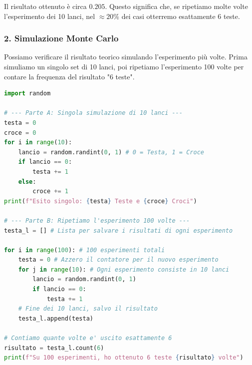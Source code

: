 \documentclass[openany,a4paper,12pt]{book}
\theoremstyle{remark}
\begin{document}
Il risultato ottenuto è circa $0.205$. Questo significa che, se ripetiamo molte volte l'esperimento dei 10 lanci, nel $\approx 20\%$ dei casi otterremo esattamente 6 teste.

\subsubsection*{2. Simulazione Monte Carlo}
Possiamo verificare il risultato teorico simulando l'esperimento più volte.
Prima simuliamo un singolo set di 10 lanci, poi ripetiamo l'esperimento 100 volte per contare la frequenza del risultato "6 teste".

\begin{lstlisting}[language=Python, frame=single, caption=Simulazione dei lanci]
import random

# --- Parte A: Singola simulazione di 10 lanci ---
testa = 0
croce = 0
for i in range(10):
    lancio = random.randint(0, 1) # 0 = Testa, 1 = Croce
    if lancio == 0:
        testa += 1
    else:
        croce += 1
print(f"Esito singolo: {testa} Teste e {croce} Croci")

# --- Parte B: Ripetiamo l'esperimento 100 volte ---
testa_l = [] # Lista per salvare i risultati di ogni esperimento

for i in range(100): # 100 esperimenti totali
    testa = 0 # Azzero il contatore per il nuovo esperimento
    for j in range(10): # Ogni esperimento consiste in 10 lanci
        lancio = random.randint(0, 1)
        if lancio == 0:
            testa += 1
    # Fine dei 10 lanci, salvo il risultato
    testa_l.append(testa)

# Contiamo quante volte e' uscito esattamente 6
risultato = testa_l.count(6)
print(f"Su 100 esperimenti, ho ottenuto 6 teste {risultato} volte")
\end{lstlisting}
\end{document}
